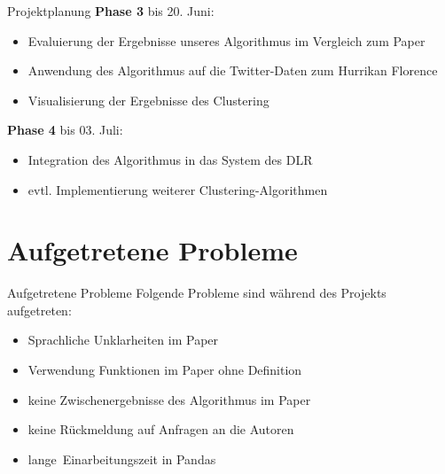 \documentclass[12pt, xcolor={usenames,dvipsnames,svgnames,x11names,table}]{beamer}
\begin{document}
	\begin{frame}{Projektplanung}{}
		\textbf{Phase 3} bis 20. Juni:
		\begin{itemize}
			\item Evaluierung der Ergebnisse unseres Algorithmus im Vergleich zum Paper
			\item Anwendung des Algorithmus auf die Twitter-Daten zum Hurrikan Florence
			\item Visualisierung der Ergebnisse des Clustering
		\end{itemize}\bigskip
		
		\textbf{Phase 4} bis 03. Juli:
		\begin{itemize}
			\item Integration des Algorithmus in das System des DLR
			\item evtl. Implementierung weiterer Clustering-Algorithmen
		\end{itemize}
	\end{frame}
	
	
	\section{Aufgetretene Probleme}
	\begin{frame}{Aufgetretene Probleme}{}
		Folgende Probleme sind während des Projekts aufgetreten:
		
		\begin{itemize}
			\item Sprachliche Unklarheiten im Paper
			\item Verwendung Funktionen im Paper ohne Definition
			\item keine Zwischenergebnisse des Algorithmus im Paper
			\item keine Rückmeldung auf Anfragen an die Autoren
			\item \glqq lange\grqq\ Einarbeitungszeit in Pandas
		\end{itemize}
	\end{frame}
	
	
\end{document}
